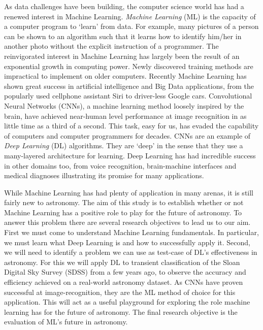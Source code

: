 As data challenges have been building, the computer science world has had a renewed interest in Machine Learning.
\textit{Machine Learning} (ML) is the capacity of a computer program to `learn' from data.
For example, many pictures of a person can be shown to an algorithm such that it learns how to identify him/her in another photo without the explicit instruction of a programmer.
The reinvigorated interest in Machine Learning has largely been the result of an exponential growth in computing power.
Newly discovered training methods are impractical to implement on older computers.
Recently Machine Learning has shown great success in artificial intelligence and Big Data applications,  from the popularly used cellphone assistant Siri\citep{Siri} to driver-less Google cars\citep{waldrop2015no}.
Convolutional Neural Networks (CNNs), a machine learning method loosely inspired by the brain, have achieved near-human level performance at image recognition in as little time as a third of a second\citep{taigman2014deepface}.
This task, easy for us, has evaded the capability of computers and computer programmers for decades.
CNNs are an example of \textit{Deep Learning} (DL) algorithms.
They are `deep' in the sense that they use a many-layered architecture for learning.
Deep Learning has had incredible success in other domains too, from voice recognition, brain-machine interfaces and medical diagnoses illustrating its promise for many applications.


While Machine Learning has had plenty of application in many arenas, it is still fairly new to astronomy.
The aim of this study is to establish whether or not Machine Learning has a positive role to play for the future of astronomy.
To answer this problem there are several research objectives to lead us to our aim.
First we must come to understand Machine Learning fundamentals.
In particular, we must learn what Deep Learning is and how to successfully apply it.
Second, we will need to identify a problem we can use as test-case of DL's effectiveness in astronomy.
For this we will apply DL to transient classification of the Sloan Digital Sky Survey (SDSS) from a few years ago, to observe the accuracy and efficiency achieved on a real-world astronomy dataset.
As CNNs have proven successful at image-recognition, they are the ML method of choice for this application.
This will act as a useful playground for exploring the role machine learning has for the future of astronomy.
The final research objective is the evaluation of ML's future in astronomy.

